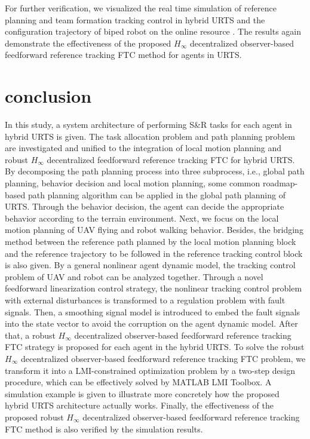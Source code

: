 \documentclass{ieeeaccess}
\begin{document}
For further verification, we visualized the real time simulation of reference planning and team formation tracking control in hybrid URTS and the configuration trajectory of biped robot on the online resource \cite{mySimulation}. The results again demonstrate the effectiveness of the proposed $H_\infty$ decentralized observer-based feedforward reference tracking FTC method for agents in URTS.

\section{conclusion}
In this study, a system architecture of performing S\&R tasks for each agent in hybrid URTS is given. The task allocation problem and path planning problem are investigated and unified to the integration of local motion planning and robust $H_\infty$ decentralized feedforward reference tracking FTC for hybrid URTS. By decomposing the path planning process into three subprocess, i.e., global path planning, behavior decision and local motion planning, some common roadmap-based path planning algorithm can be applied in the global path planning of URTS. Through the behavior decision, the agent can decide the appropriate behavior according to the terrain environment. Next, we focus on the local motion planning of UAV flying and robot walking behavior. Besides, the bridging method between the reference path planned by the local motion planning block and the reference trajectory to be followed in the reference tracking control block is also given. By a general nonlinear agent dynamic model, the tracking control problem of UAV and robot can be analyzed together. Through a novel feedforward linearization control strategy, the nonlinear tracking control problem with external disturbances is transformed to a regulation problem with fault signals. Then, a smoothing signal model is introduced to embed the fault signals into the state vector to avoid the corruption on the agent dynamic model. After that, a robust $H_\infty$ decentralized observer-based feedforward reference tracking FTC strategy is proposed for each agent in the hybrid URTS. To solve the robust $H_\infty$ decentralized observer-based feedforward reference tracking FTC problem, we transform it into a LMI-constrained optimization problem by a two-step design procedure, which can be effectively solved by MATLAB LMI Toolbox. A simulation example is given to illustrate more concretely how the proposed hybrid URTS architecture actually works. Finally, the effectiveness of the proposed robust $H_\infty$ decentralized observer-based feedforward reference tracking FTC method is also verified by the simulation results.
\end{document}

